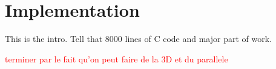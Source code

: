 \chapter{Implementation}

This is the intro. Tell that 8000 lines of C code and major part of work.

\textcolor{red}{terminer par le fait qu'on peut faire de la 3D et du parallele}